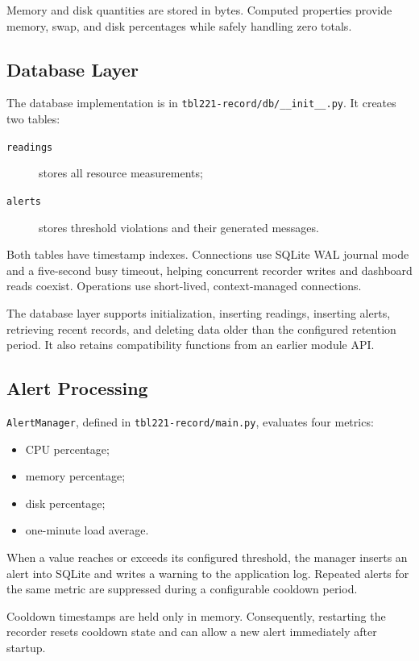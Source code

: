 \documentclass[11pt,a4paper]{article}
\begin{document}
Memory and disk quantities are stored in bytes. Computed properties provide memory, swap, and disk percentages while safely handling zero totals.

\subsection{Database Layer}

The database implementation is in \texttt{tbl221-record/db/\_\_init\_\_.py}. It creates two tables:

\begin{description}
  \item[\texttt{readings}] stores all resource measurements;
  \item[\texttt{alerts}] stores threshold violations and their generated messages.
\end{description}

Both tables have timestamp indexes. Connections use SQLite WAL journal mode and a five-second busy timeout, helping concurrent recorder writes and dashboard reads coexist. Operations use short-lived, context-managed connections.

The database layer supports initialization, inserting readings, inserting alerts, retrieving recent records, and deleting data older than the configured retention period. It also retains compatibility functions from an earlier module API.

\subsection{Alert Processing}

\texttt{AlertManager}, defined in \texttt{tbl221-record/main.py}, evaluates four metrics:

\begin{itemize}
  \item CPU percentage;
  \item memory percentage;
  \item disk percentage;
  \item one-minute load average.
\end{itemize}

When a value reaches or exceeds its configured threshold, the manager inserts an alert into SQLite and writes a warning to the application log. Repeated alerts for the same metric are suppressed during a configurable cooldown period.

Cooldown timestamps are held only in memory. Consequently, restarting the recorder resets cooldown state and can allow a new alert immediately after startup.
\end{document}
